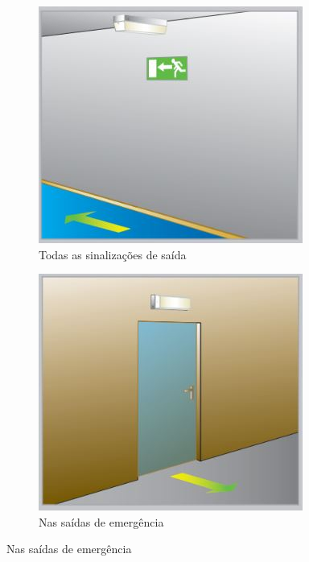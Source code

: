 \begin{figure}[H]
\begin{subfigure}[b]{0.3\textwidth}
			\includegraphics[width=\textwidth]{Figures/3. Lighting/light-safety2.jpg}
			\caption{Todas as sinalizações de saída}
			\label{fig: style 1 image b}
		\end{subfigure}
		\hfill
		\begin{subfigure}[b]{0.3\textwidth}
			\centering
			\includegraphics[width=\textwidth]{Figures/3. Lighting/light-safety3.jpg}
			\caption{Nas saídas de emergência}
			\label{fig: style 1 image c}
		\end{subfigure}
	\end{figure}

